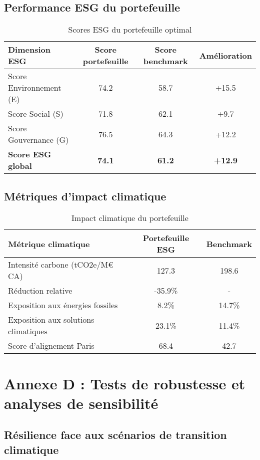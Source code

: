 \subsection{Performance ESG du portefeuille}

\begin{table}[h]
\centering
\caption{Scores ESG du portefeuille optimal}
\begin{tabular}{lccc}
\toprule
\textbf{Dimension ESG} & \textbf{Score portefeuille} & \textbf{Score benchmark} & \textbf{Amélioration} \\
\midrule
Score Environnement (E) & 74.2 & 58.7 & +15.5 \\
Score Social (S) & 71.8 & 62.1 & +9.7 \\
Score Gouvernance (G) & 76.5 & 64.3 & +12.2 \\
\midrule
\textbf{Score ESG global} & \textbf{74.1} & \textbf{61.2} & \textbf{+12.9} \\
\bottomrule
\end{tabular}
\end{table}

\subsection{Métriques d'impact climatique}

\begin{table}[h]
\centering
\caption{Impact climatique du portefeuille}
\begin{tabular}{lcc}
\toprule
\textbf{Métrique climatique} & \textbf{Portefeuille ESG} & \textbf{Benchmark} \\
\midrule
Intensité carbone (tCO2e/M€ CA) & 127.3 & 198.6 \\
Réduction relative & -35.9\% & - \\
Exposition aux énergies fossiles & 8.2\% & 14.7\% \\
Exposition aux solutions climatiques & 23.1\% & 11.4\% \\
Score d'alignement Paris & 68.4 & 42.7 \\
\bottomrule
\end{tabular}
\end{table}

\section{Annexe D : Tests de robustesse et analyses de sensibilité}

\subsection{Résilience face aux scénarios de transition climatique}

